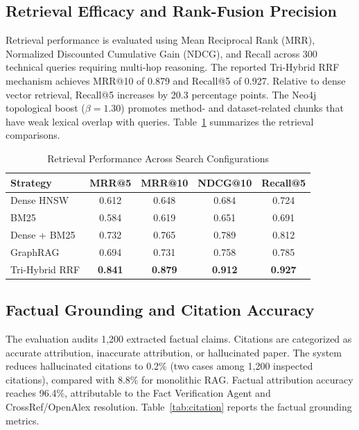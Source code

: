 \documentclass[conference]{IEEEtran}
\begin{document}
\subsection{Retrieval Efficacy and Rank-Fusion Precision}
Retrieval performance is evaluated using Mean Reciprocal Rank (MRR), Normalized Discounted Cumulative Gain (NDCG), and Recall across 300 technical queries requiring multi-hop reasoning. The reported Tri-Hybrid RRF mechanism achieves MRR@10 of 0.879 and Recall@5 of 0.927. Relative to dense vector retrieval, Recall@5 increases by 20.3 percentage points. The Neo4j topological boost ($\beta = 1.30$) promotes method- and dataset-related chunks that have weak lexical overlap with queries. Table~\ref{tab:retrieval} summarizes the retrieval comparisons.

\begin{table}[!t]
\caption{Retrieval Performance Across Search Configurations}
\label{tab:retrieval}
\centering
\footnotesize
\setlength{\tabcolsep}{3.5pt}
\begin{tabular}{@{}lcccc@{}}
\toprule
\textbf{Strategy} & \textbf{MRR@5} & \textbf{MRR@10} & \textbf{NDCG@10} & \textbf{Recall@5} \\
\midrule
Dense HNSW & 0.612 & 0.648 & 0.684 & 0.724 \\
BM25 & 0.584 & 0.619 & 0.651 & 0.691 \\
Dense + BM25 & 0.732 & 0.765 & 0.789 & 0.812 \\
GraphRAG & 0.694 & 0.731 & 0.758 & 0.785 \\
Tri-Hybrid RRF & \textbf{0.841} & \textbf{0.879} & \textbf{0.912} & \textbf{0.927} \\
\bottomrule
\end{tabular}
\end{table}

\subsection{Factual Grounding and Citation Accuracy}
The evaluation audits 1,200 extracted factual claims. Citations are categorized as accurate attribution, inaccurate attribution, or hallucinated paper. The system reduces hallucinated citations to 0.2\% (two cases among 1,200 inspected citations), compared with 8.8\% for monolithic RAG. Factual attribution accuracy reaches 96.4\%, attributable to the Fact Verification Agent and CrossRef/OpenAlex resolution. Table~\ref{tab:citation} reports the factual grounding metrics.
\end{document}
